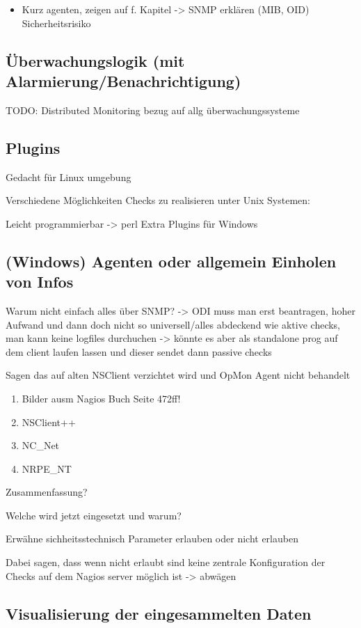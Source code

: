 \begin{itemize}
\item Kurz agenten, zeigen auf f. Kapitel -> SNMP erklären (MIB, OID) Sicherheitsrisiko
\end{itemize}

\subsection{Überwachungslogik (mit Alarmierung/Benachrichtigung)}
\label{dismoni}
\begin{center}
TODO: Distributed Monitoring bezug auf allg überwachungssysteme
\end{center}

\subsection{Plugins}
Gedacht für Linux umgebung

Verschiedene Möglichkeiten Checks zu realisieren unter Unix Systemen:

Leicht programmierbar -> perl 
Extra Plugins für Windows

\subsection{(Windows) Agenten oder allgemein Einholen von Infos}
Warum nicht einfach alles über SNMP? -> ODI muss man erst beantragen, hoher Aufwand und dann doch nicht so universell/alles abdeckend wie aktive checks, man kann keine logfiles durchuchen -> könnte es aber als standalone prog auf dem client laufen lassen und dieser sendet dann passive checks

Sagen das auf alten NSClient verzichtet wird und OpMon Agent nicht behandelt
\begin{enumerate}
\item Bilder ausm Nagios Buch Seite 472ff!
\item NSClient++
\item NC\_Net
\item NRPE\_NT
\end{enumerate}

Zusammenfassung?


Welche wird jetzt eingesetzt und warum?

Erwähne sichheitsstechnisch Parameter erlauben oder nicht erlauben

Dabei sagen, dass wenn nicht erlaubt sind keine zentrale Konfiguration der Checks auf dem Nagios server möglich ist -> abwägen

\subsection{Visualisierung der eingesammelten Daten}